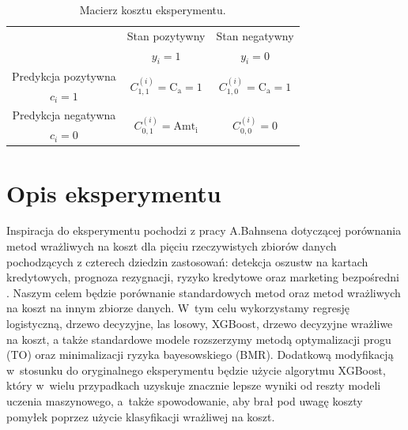 \documentclass[inzynierska]{pwr_wmat_praca_dyplomowa}
\theoremstyle{plain}
\numberwithin{theorem}{chapter}
\theoremstyle{definition}
\numberwithin{theorem}{chapter}
\begin{document}
\begin{table}[h]
	\begin{center}
		\begin{tabular}{c|c|c}
			\multirow{2}{4em}{} & Stan pozytywny & Stan negatywny \\
			& $y_i = 1$            & $y_i = 0$ \\
			\hline
			Predykcja pozytywna & \multirow{2}{8em}{\centering $C^{(i)}_{1,1} = \text{C}_{\text{a}} = 1$} & \multirow{2}{8em}{\centering $C^{(i)}_{1,0} = \text{C}_{\text{a}} = 1$} \\
			$c_i = 1$         &                    &                    \\
			\hline
			Predykcja negatywna & \multirow{2}{8em}{\centering $C^{(i)}_{0,1} = \text{Amt}_{\text{i}}$} & \multirow{2}{8em}{\centering $C^{(i)}_{0,0} = 0$} \\
			$c_i = 0$         &                    &                    \\
		\end{tabular}
	\end{center}
	\caption{Macierz kosztu eksperymentu.}
	\label{tab:macierz-kosztu-eksperyment}
\end{table}

\section{Opis eksperymentu}
Inspiracja do eksperymentu pochodzi z pracy A.Bahnsena dotyczącej porównania metod wrażliwych na koszt dla pięciu rzeczywistych zbiorów danych pochodzących z czterech dziedzin zastosowań: detekcja oszustw na kartach kredytowych, prognoza rezygnacji, ryzyko kredytowe oraz marketing bezpośredni \cite{alej2015ensemble}. Naszym celem będzie porównanie standardowych metod oraz metod wrażliwych na koszt na innym zbiorze danych. W~tym celu wykorzystamy regresję logistyczną, drzewo decyzyjne, las losowy, XGBoost, drzewo decyzyjne wrażliwe na koszt, a także standardowe modele rozszerzymy metodą optymalizacji progu (TO) oraz minimalizacji ryzyka bayesowskiego (BMR). Dodatkową modyfikacją w~stosunku do oryginalnego eksperymentu będzie użycie algorytmu XGBoost, który w~wielu przypadkach uzyskuje znacznie lepsze wyniki od reszty modeli uczenia maszynowego, a~także spowodowanie, aby brał pod uwagę koszty pomyłek poprzez użycie klasyfikacji wrażliwej na koszt.
\end{document}
